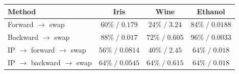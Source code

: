 \begin{tabular}{lccc}
\toprule
Method & Iris & Wine & Ethanol \\
\midrule
Forward $\rightarrow$ swap & $60\%\;/\;0.179$ & $24\%\;/\;3.24$ & $84\%\;/\;0.0188$ \\
Backward $\rightarrow$ swap & $88\%\;/\;0.017$ & $72\%\;/\;0.605$ & $96\%\;/\;0.0033$ \\
IP $\rightarrow$ forward $\rightarrow$ swap & $56\%\;/\;0.0814$ & $40\%\;/\;2.45$ & $64\%\;/\;0.018$ \\
IP $\rightarrow$ backward $\rightarrow$ swap & $64\%\;/\;0.0545$ & $64\%\;/\;0.615$ & $64\%\;/\;0.018$ \\
\bottomrule
\end{tabular}
